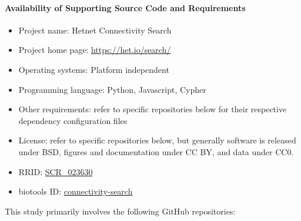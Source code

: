 \hypertarget{availability-of-supporting-source-code-and-requirements}{%
\paragraph{Availability of Supporting Source Code and Requirements}\label{availability-of-supporting-source-code-and-requirements}}

\begin{itemize}
\tightlist
\item
  Project name: Hetnet Connectivity Search
\item
  Project home page: \url{https://het.io/search/}
\item
  Operating systems: Platform independent
\item
  Programming language: Python, Javascript, Cypher
\item
  Other requirements:
  refer to specific repositories below for their respective dependency configuration files
\item
  License:
  refer to specific repositories below,
  but generally software is released under BSD,
  figures and documentation under CC BY,
  and data under CC0.
\item
  RRID: \href{https://scicrunch.org/resolver/RRID:SCR_023630}{SCR\_023630}
\item
  biotools ID: \href{https://bio.tools/connectivity-search}{connectivity-search}
\end{itemize}

This study primarily involves the following GitHub repositories:

